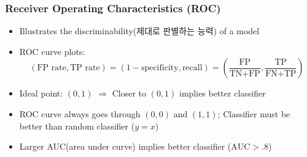 \subsubsection*{Receiver Operating Characteristics (ROC)}
\begin{itemize}
    \item Illustrates the discriminability(제대로 판별하는 능력) of a model
    \item ROC curve plots:
    \begin{equation}
        (\text{FP~rate},\text{TP~rate})=(1-\text{specificity},\text{recall})=\left(\frac{\text{FP}}{\text{TN+FP}},\frac{\text{TP}}{\text{FN+TP}}\right)
    \end{equation}
    \item Ideal point: $(0,1)$ $\Rightarrow$ Closer to $(0,1)$ implies better classifier
    \item ROC curve always goes through $(0,0)$ and $(1,1)$; Classifier must be better than random classifier ($y=x$)
    \item Larger AUC(area under curve) implies better classifier ($\text{AUC}>.8$)
\end{itemize}
\begin{figures}
\end{figures}
